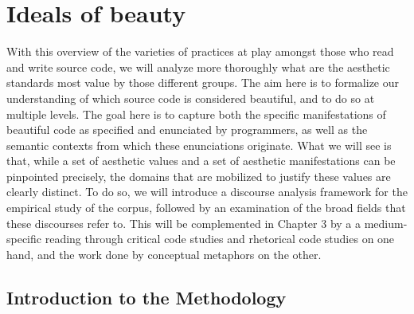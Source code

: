 \pagebreak

\section{Ideals of beauty}
\label{sec:ideals-beauty}

With this overview of the varieties of practices at play amongst those who read and write source code, we will analyze more thoroughly what are the aesthetic standards most value by those different groups. The aim here is to formalize our understanding of which source code is considered beautiful, and to do so at multiple levels. The goal here is to capture both the specific manifestations of beautiful code as specified and enunciated by programmers, as well as the semantic contexts from which these enunciations originate. What we will see is that, while a set of aesthetic values and a set of aesthetic manifestations can be pinpointed precisely, the domains that are mobilized to justify these values are clearly distinct. To do so, we will introduce a discourse analysis framework for the empirical study of the corpus, followed by an examination of the broad fields that these discourses refer to. This will be complemented in Chapter 3 by a a medium-specific reading through critical code studies and rhetorical code studies on one hand, and the work done by conceptual metaphors on the other.

\subsection{Introduction to the Methodology}
\label{subsec:ideals-methodology}

